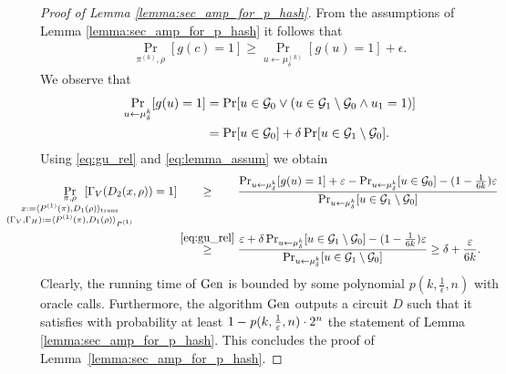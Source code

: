 \begin{proof}[Proof of Lemma \ref{lemma:sec_amp_for_p_hash}]
 From the assumptions of Lemma \ref{lemma:sec_amp_for_p_hash} it follows that
 \begin{align}
   \label{eq:lemma_assum}
   \Pr_{\pi^{(k)}, \rho} [g(c) = 1] \geq \Pr_{u \leftarrow \mu_{\delta}^{(k)}}[g(u) = 1] + \epsilon.
 \end{align}
We observe that
\begin{align}
  \label{eq:gu_rel}
\underset{u \leftarrow \mu_{\delta}^k}{\Pr}[g(u) = 1]
&= \Pr[u \in \mathcal{G}_0 \lor ( u \in \mathcal{G}_1 \setminus \mathcal{G}_0 \land u_1 = 1)] \notag\\
&= \Pr[u \in \mathcal{G}_0] + \delta \Pr[u \in \mathcal{G}_1 \setminus \mathcal{G}_0].
\end{align}
 Using \eqref{eq:gu_rel} and \eqref{eq:lemma_assum} we obtain
 \begin{align}
   \label{eq:proof_final}
   \IndI
\underset{
  \mathclap{
  \substack{\pi, \rho \\ x := \langle P^{(1)}(\pi), D_1(\rho) \rangle_{\text{trans}}
    \\ (\Gamma_V, \Gamma_H) := \langle P^{(1)}(\pi), D_1 (\rho) \rangle_{P^{(1)}} }}}
{\Pr}\mkern13mu[\Gamma_V(D_2(x, \rho)) = 1]
 &\stackrel{\hphantom{\eqref{eq:gu_rel}}}{\geq} \frac{ {\Pr}_{u \leftarrow \mu_{\delta}^{k}}[g(u) = 1] + \epsilon -
 \Pr_{u \leftarrow \mu_{\delta}^{k}}[u \in \cG_0] - (1 - \frac{1}{6k})\epsilon} {\Pr_{u \leftarrow \mu_{\delta}^{k}}[u \in \cG_1 \setminus \cG_0]} \notag\\
 &\stackrel{\eqref{eq:gu_rel}}{\geq} \frac{\epsilon + \delta\Pr_{u \leftarrow \mu_{\delta}^{k}}[u \in \cG_1 \setminus \cG_0] - (1 - \frac{1}{6k})\epsilon}
{\Pr_{u \leftarrow \mu_{\delta}^{k}}[u \in \cG_1 \setminus \cG_0]} \geq \delta + \frac{\epsilon}{6k}.
\end{align}
Clearly, the running time of $\operatorname{\text{Gen}}$ is bounded by some polynomial $p(k, \frac{1}{\epsilon}, n)$ with oracle calls.
Furthermore, the algorithm $\operatorname{\text{Gen}}$ outputs a circuit $D$ such that it satisfies with probability at least $1 - \operatorname{\mathit{p}}(k, \frac{1}{\varepsilon}, n) \cdot 2^n$
the statement of Lemma \ref{lemma:sec_amp_for_p_hash}. This concludes the proof of Lemma~\ref{lemma:sec_amp_for_p_hash}.
\end{proof}
%
